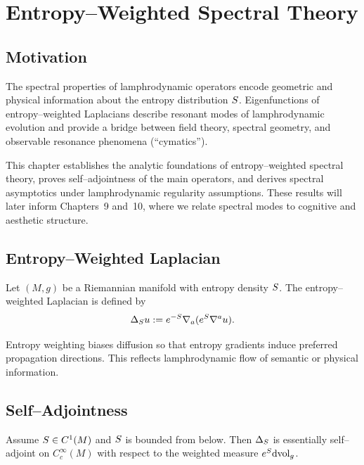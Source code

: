 
\chapter{Entropy--Weighted Spectral Theory}
\label{chap:entropy-weighted-spectral}

\section{Motivation}

The spectral properties of lamphrodynamic operators encode geometric and
physical information about the entropy distribution $S$.
Eigenfunctions of entropy--weighted Laplacians describe resonant modes
of lamphrodynamic evolution and provide a bridge between field theory,
spectral geometry, and observable resonance phenomena (``cymatics'').

This chapter establishes the analytic foundations of entropy--weighted
spectral theory, proves self--adjointness of the main operators, and
derives spectral asymptotics under lamphrodynamic regularity
assumptions. These results will later inform Chapters~9 and~10, where we
relate spectral modes to cognitive and aesthetic structure.


\section{Entropy--Weighted Laplacian}

Let $(M,g)$ be a Riemannian manifold with entropy density $S$. The
entropy--weighted Laplacian is defined by
\[
  \Delta_{S} u := e^{-S}\nabla_a(e^{S}\nabla^a u).
\]

\begin{remark}
Entropy weighting biases diffusion so that entropy gradients induce
preferred propagation directions. This reflects lamphrodynamic flow of
semantic or physical information.
\end{remark}


\section{Self--Adjointness}

\begin{theorem}
\label{thm:self-adjoint}
Assume $S\in C^1(M)$ and $S$ is bounded from below. Then
$\Delta_{S}$ is essentially self--adjoint on $C_c^\infty(M)$ with
respect to the weighted measure $e^{S}\mathrm{dvol}_g$.
\end{theorem}

